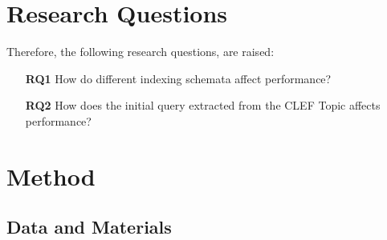 \section{Research Questions}

Therefore, the following research questions, are raised: 
\begin{enumerate}
  \item[\textbf{RQ1}]  How do different indexing schemata affect performance? 
  \item[\textbf{RQ2}] How does the initial query extracted from the CLEF Topic affects performance?
\end{enumerate}

\section{Method}

\subsection{Data and Materials}

